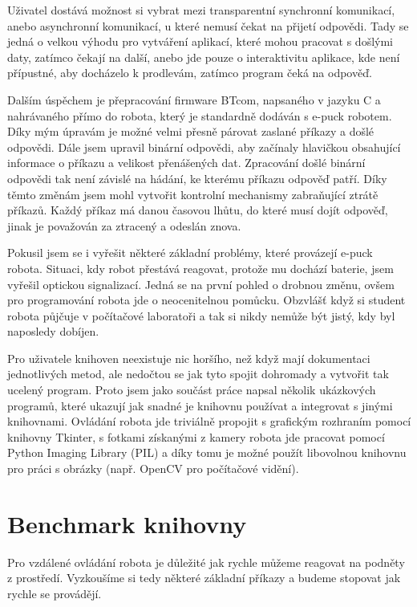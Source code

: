 \documentclass[12pt,notitlepage]{report}
\begin{document}
    Uživatel dostává možnost si vybrat mezi transparentní synchronní
    komunikací, anebo asynchronní komunikací, u které nemusí čekat na přijetí
    odpovědi. Tady se jedná o velkou výhodu pro vytváření aplikací, které mohou
    pracovat s došlými daty, zatímco čekají na další, anebo jde pouze o
    interaktivitu aplikace, kde není přípustné, aby docházelo k prodlevám,
    zatímco program čeká na odpověď.

    Dalším úspěchem je přepracování firmware BTcom, napsaného v jazyku C a
    nahrávaného přímo do robota, který je standardně dodáván s e-puck robotem.
    Díky mým úpravám je možné velmi přesně párovat zaslané příkazy a došlé
    odpovědi. Dále jsem upravil binární odpovědi, aby začínaly hlavičkou
    obsahující informace o příkazu a velikost přenášených dat. Zpracování došlé
    binární odpovědi tak není závislé na hádání, ke kterému příkazu odpověď
    patří. Díky těmto změnám jsem mohl vytvořit kontrolní mechanismy
    zabraňující ztrátě příkazů. Každý příkaz má danou časovou lhůtu, do které
    musí dojít odpověď, jinak je považován za ztracený a odeslán znova.

    Pokusil jsem se i vyřešit některé základní problémy, které provázejí e-puck
    robota. Situaci, kdy robot přestává reagovat, protože mu dochází baterie,
    jsem vyřešil optickou signalizací. Jedná se na první pohled o drobnou
    změnu, ovšem pro programování robota jde o neocenitelnou pomůcku. Obzvlášť
    když si student robota půjčuje v počítačové laboratoři a tak si nikdy
    nemůže být jistý, kdy byl naposledy dobíjen.

    Pro uživatele knihoven neexistuje nic horšího, než když mají dokumentaci
    jednotlivých metod, ale nedočtou se jak tyto spojit dohromady a vytvořit
    tak ucelený program. Proto jsem jako součást práce napsal několik
    ukázkových programů, které ukazují jak snadné je knihovnu používat a
    integrovat s jinými knihovnami. Ovládání robota jde triviálně propojit s
    grafickým rozhraním pomocí knihovny Tkinter, s fotkami získanými z kamery
    robota jde pracovat pomocí Python Imaging Library (PIL) a díky tomu je
    možné použít libovolnou knihovnu pro práci s obrázky (např. OpenCV pro
    počítačové vidění).

    \section{Benchmark knihovny}

    Pro vzdálené ovládání robota je důležité jak rychle můžeme reagovat na
    podněty z prostředí. Vyzkoušíme si tedy některé základní příkazy a budeme
    stopovat jak rychle se provádějí.
\end{document}
